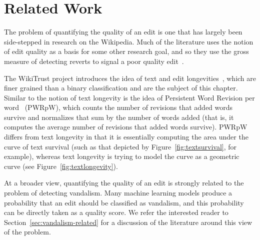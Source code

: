\section{Related Work}

The problem of quantifying the quality of an edit is one that has
largely been side-stepped in research on the Wikipedia.
Much of the literature uses the notion of edit quality as a basis
for some other research goal, and so they use the gross measure
of detecting reverts to signal a poor quality
edit~\cite{Adler2007,Smets2008,Itakura2009,Belani2010}.

The WikiTrust project introduces the idea of text and edit
longevities~\cite{Adler2007}, which are finer grained than a
binary classification and are the subject of this chapter.
Similar to the notion of text longevity is the idea
of Persistent Word Revision per
word~\cite{Halfaker2009,Halfaker2011} (PWRpW),
which counts the number of revisions that added words survive
and normalizes that sum by the number of words added (that is,
it computes the average number of revisions that added words survive).
PWRpW differs from text longevity in that it is essentially computing
the area under the curve of text survival (such as that depicted by
Figure~\ref{fig:textsurvival}, for example),
whereas text longevity is trying to model the curve as a
geometric curve (see Figure~\ref{fig:textlongevity}).

At a broader view, quantifying the quality of an edit is strongly
related to the problem of detecting vandalism.
Many machine learning models produce a probability that an edit
should be classified as vandalism, and this probability can be
directly taken as a quality score.
We refer the interested reader to Section~\ref{sec:vandalism-related}
for a discussion of the literature around this view of the problem.

